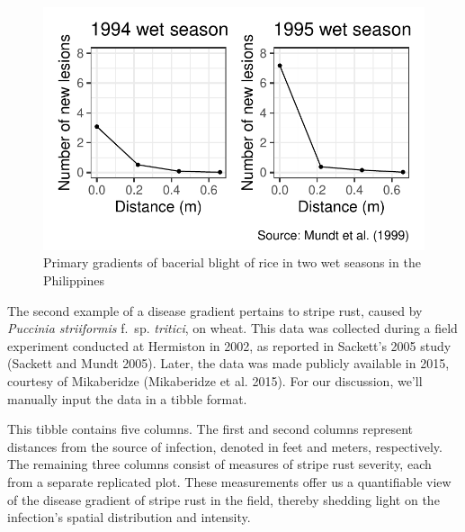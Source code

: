 \documentclass[
  letterpaper,
  DIV=11,
  numbers=noendperiod]{scrreprt}
\begin{document}
\begin{figure}[H]

{\centering \includegraphics{spatial-gradients_files/figure-pdf/fig-grad1-1.pdf}

}

\caption{\label{fig-grad1}Primary gradients of bacerial blight of rice
in two wet seasons in the Philippines}

\end{figure}

The second example of a disease gradient pertains to stripe rust, caused
by \emph{Puccinia striiformis} f.~sp. \emph{tritici}, on wheat. This
data was collected during a field experiment conducted at Hermiston in
2002, as reported in Sackett's 2005 study (Sackett and Mundt 2005).
Later, the data was made publicly available in 2015, courtesy of
Mikaberidze (Mikaberidze et al. 2015). For our discussion, we'll
manually input the data in a tibble format.

This tibble contains five columns. The first and second columns
represent distances from the source of infection, denoted in feet and
meters, respectively. The remaining three columns consist of measures of
stripe rust severity, each from a separate replicated plot. These
measurements offer us a quantifiable view of the disease gradient of
stripe rust in the field, thereby shedding light on the infection's
spatial distribution and intensity.
\end{document}
